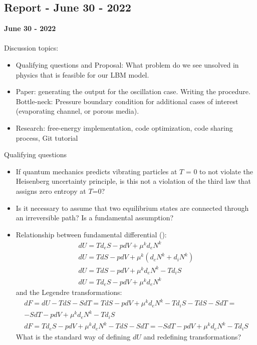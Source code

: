 \documentclass[8pt]{beamer}
\begin{document}
	\subsection{Report - June 30 - 2022}
	\label{}
	\justifying
	\begin{frame}{}
		\textbf{June 30 - 2022}\\~\\
		Discussion topics:
		\begin{itemize}
			\item Qualifying questions and Proposal: What problem do we see unsolved in physics that is feasible for our LBM model. 
			\item Paper: generating the output for the oscillation case. Writing the procedure. Bottle-neck: Pressure boundary condition for additional cases of interest (evaporating channel, or porous media).
			\item Research: free-energy implementation, code optimization, code sharing process, Git tutorial
		\end{itemize}
	\end{frame}
	
	\begin{frame}[t]{Qualifying questions}
	 \begin{itemize}
	 	\item If quantum mechanics predicts vibrating particles at $T$ = 0 to not violate the Heisenberg uncertainty principle, is this not a violation of the third law that assigns zero entropy at $T$=0?
	 	\item Is it necessary to assume that two equilibrium states are connected through an irreversible path? Is a fundamental assumption?
	 	\item Relationship between fundamental differential ():
	 	\begin{equation}
	 		\begin{split}
	 			dU = Td_e S - p dV + \mu^k d_e N^k\\
	 			dU = Td S - p dV + \mu^k (d_e N^k + d_i N^k) \\ dU = Td S - p dV + \mu^k d_e N^k - T d_i S \\
	 			dU = T d_e S - p dV + \mu^k d_e N^k 
	 		\end{split}
	 	\end{equation}
 		and the Legendre transformations:
 		\begin{equation}
 			\begin{split}
 				dF  = dU - TdS - SdT = Td S - p dV + \mu^k d_e N^k - T d_i S - TdS - SdT =\\ - S dT - p dV + \mu^k d_e N^k - T d_i S\\
 				dF  = T d_e S - p dV + \mu^k d_e N^k - TdS - SdT = -S dT - p dV + \mu^k d_e N^k - T d_i S 
 			\end{split}
 		\end{equation}
 		What is the standard way of defining $dU$ and redefining transformations?
	 \end{itemize}
	\end{frame}
	
\end{document}
